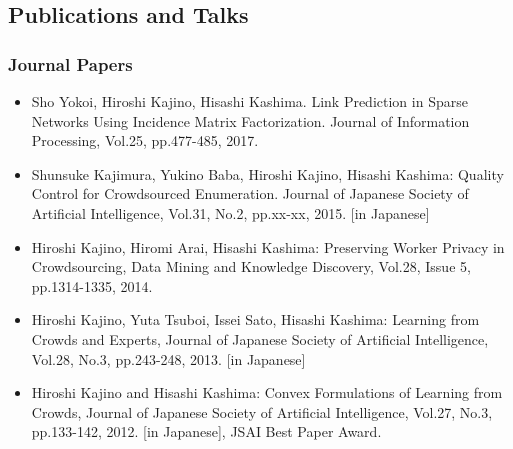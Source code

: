 \documentclass[a4paper,9pt]{article}
\begin{document}
\subsection*{Publications and Talks}


\subsubsection*{Journal Papers}
\begin{itemize}
 \item Sho Yokoi, Hiroshi Kajino, Hisashi Kashima. Link Prediction in Sparse Networks Using Incidence Matrix Factorization. Journal of Information Processing, Vol.25, pp.477-485, 2017. 
 \item Shunsuke Kajimura, Yukino Baba, Hiroshi Kajino, Hisashi Kashima: Quality Control for Crowdsourced Enumeration. Journal of Japanese Society of Artificial Intelligence, Vol.31, No.2, pp.xx-xx, 2015. [in Japanese]
 \item Hiroshi Kajino, Hiromi Arai, Hisashi Kashima: Preserving Worker Privacy in Crowdsourcing, Data Mining and Knowledge Discovery, Vol.28, Issue 5, pp.1314-1335, 2014.
 \item Hiroshi Kajino, Yuta Tsuboi, Issei Sato, Hisashi Kashima: Learning from Crowds and Experts, Journal of Japanese Society of Artificial Intelligence, Vol.28, No.3, pp.243-248, 2013. [in Japanese]
 \item Hiroshi Kajino and Hisashi Kashima: Convex Formulations of Learning from Crowds, Journal of Japanese Society of Artificial Intelligence, Vol.27, No.3, pp.133-142, 2012. [in Japanese], {JSAI Best Paper Award}.
\end{itemize}
\end{document}
